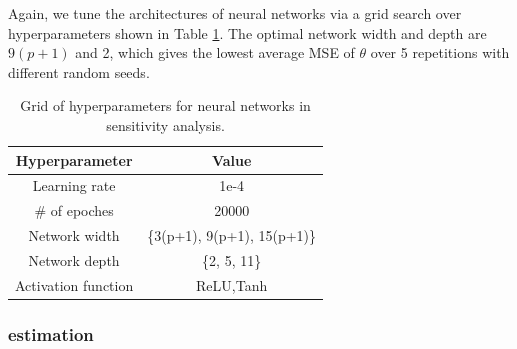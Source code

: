 \documentclass[11pt]{article}
\begin{document}


Again, we tune the architectures of neural networks via a grid search over hyperparameters shown in Table \ref{table:hyparam of 2}. The optimal network width and depth are $9(p+1)$ and 2, which gives the lowest average MSE of  $\theta$ over 5 repetitions with different random seeds. 

\begin{table}[h]
\caption{Grid of hyperparameters for neural networks in sensitivity analysis.}
\label{table:hyparam of 2}
\begin{center}
\vspace{0.3cm}
\begin{tabular}{cc}
\hline
Hyperparameter    & Value                       \\ \hline
Learning rate     & 1e-4                    \\
\# of epoches     & 20000                       \\
Network width     & \{3(p+1), 9(p+1), 15(p+1)\} \\
Network depth     & \{2, 5, 11\}                \\
Activation function & ReLU,Tanh \\
\hline
\end{tabular}
\end{center}
\end{table}

\subsubsection{estimation}
\end{document}
